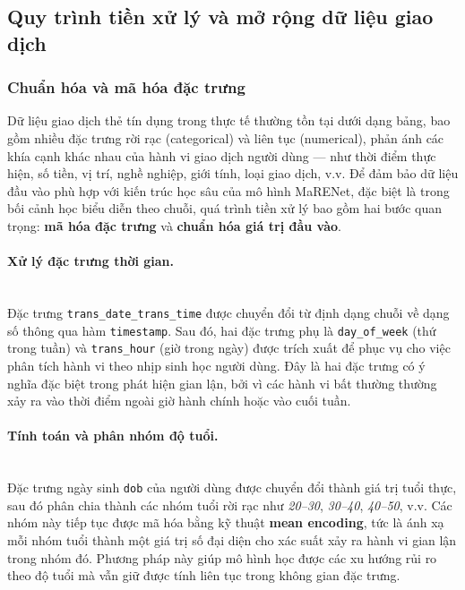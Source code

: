 \subsection{Quy trình tiền xử lý và mở rộng dữ liệu giao dịch}

\subsubsection{Chuẩn hóa và mã hóa đặc trưng}

Dữ liệu giao dịch thẻ tín dụng trong thực tế thường tồn tại dưới dạng bảng, bao gồm nhiều đặc trưng rời rạc (categorical) và liên tục (numerical), phản ánh các khía cạnh khác nhau của hành vi giao dịch người dùng — như thời điểm thực hiện, số tiền, vị trí, nghề nghiệp, giới tính, loại giao dịch, v.v. Để đảm bảo dữ liệu đầu vào phù hợp với kiến trúc học sâu của mô hình MaRENet, đặc biệt là trong bối cảnh học biểu diễn theo chuỗi, quá trình tiền xử lý bao gồm hai bước quan trọng: \textbf{mã hóa đặc trưng} và \textbf{chuẩn hóa giá trị đầu vào}.

\paragraph{Xử lý đặc trưng thời gian.}
\mbox{}\\
Đặc trưng \texttt{trans\_date\_trans\_time} được chuyển đổi từ định dạng chuỗi về dạng số thông qua hàm \texttt{timestamp}. 
Sau đó, hai đặc trưng phụ là \texttt{day\_of\_week} (thứ trong tuần) và \texttt{trans\_hour} (giờ trong ngày) được trích xuất để phục vụ cho việc phân tích hành vi theo nhịp sinh học người dùng. 
Đây là hai đặc trưng có ý nghĩa đặc biệt trong phát hiện gian lận, bởi vì các hành vi bất thường thường xảy ra vào thời điểm ngoài giờ hành chính hoặc vào cuối tuần.


\paragraph{Tính toán và phân nhóm độ tuổi.}
\mbox{}\\
Đặc trưng ngày sinh \texttt{dob} của người dùng được chuyển đổi thành giá trị tuổi thực, sau đó phân chia thành các nhóm tuổi rời rạc như \textit{20–30}, \textit{30–40}, \textit{40–50}, v.v. Các nhóm này tiếp tục được mã hóa bằng kỹ thuật \textbf{mean encoding}, tức là ánh xạ mỗi nhóm tuổi thành một giá trị số đại diện cho xác suất xảy ra hành vi gian lận trong nhóm đó. Phương pháp này giúp mô hình học được các xu hướng rủi ro theo độ tuổi mà vẫn giữ được tính liên tục trong không gian đặc trưng.

